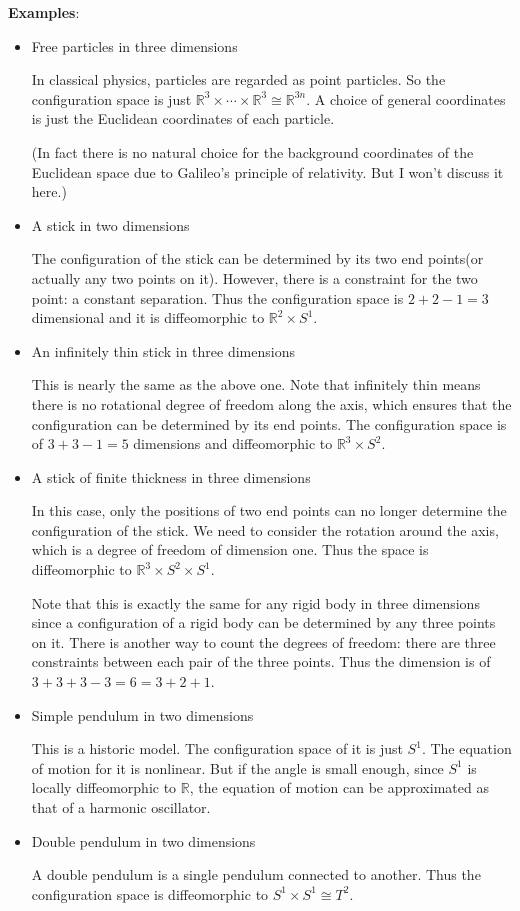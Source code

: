 \textbf{Examples}:
\begin{itemize}
    \item Free particles in three dimensions
    
    In classical physics, particles are regarded as point particles. So the configuration space is just $\mathbb{R}^3 \times \cdots \times \mathbb{R}^3 \cong \mathbb{R}^{3n}$. A choice of general coordinates is just the Euclidean coordinates of each particle.
    
    (In fact there is no natural choice for the background coordinates of the Euclidean space due to Galileo's principle of relativity. But I won't discuss it here.)
    
    \item A stick in two dimensions
    
    The configuration of the stick can be determined by its two end points(or actually any two points on it). However, there is a constraint for the two point: a constant separation. Thus the configuration space is $2+2-1=3$ dimensional and it is diffeomorphic to $\mathbb{R}^2\times S^1$.
    
    \item An infinitely thin stick in three dimensions
    
    This is nearly the same as the above one. Note that infinitely thin means there is no rotational degree of freedom along the axis, which ensures that the configuration can be determined by its end points. The configuration space is of $3+3-1=5$ dimensions and diffeomorphic to $\mathbb{R}^3\times S^2$.
    
    \item A stick of finite thickness in three dimensions
    
    In this case, only the positions of two end points can no longer determine the configuration of the stick. We need to consider the rotation around the axis, which is a degree of freedom of dimension one. Thus the space is diffeomorphic to $\mathbb{R}^3\times S^2\times S^1$.
    
    Note that this is exactly the same for any rigid body in three dimensions since a configuration of a rigid body can be determined by any three points on it. There is another way to count the degrees of freedom: there are three constraints between each pair of the three points. Thus the dimension is of $3+3+3-3=6=3+2+1$.
    
    \item Simple pendulum in two dimensions
    
    This is a historic model. The configuration space of it is just $S^1$. The equation of motion for it is nonlinear. But if the angle is small enough, since $S^1$ is locally diffeomorphic to $\mathbb{R}$, the equation of motion can be approximated as that of a harmonic oscillator.
    
    \item Double pendulum in two dimensions
    
    A double pendulum is a single pendulum connected to another. Thus the configuration space is diffeomorphic to $S^1\times S^1\cong T^2$.
    
\end{itemize}

